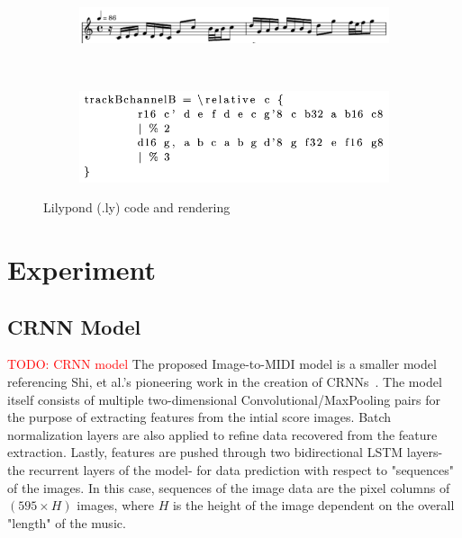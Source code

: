 \documentclass[review,sigconf]{acmart}
\newcommand{\todo}[1]{\textcolor{red}{TODO: #1}}
\begin{document}
\begin{figure}
	\begin{subfigure}
		\centering
		\includegraphics[width = .8\linewidth]{./figures/lilypond-snippet.png}
	\end{subfigure}
	~
	\begin{subfigure}
		\centering
		\includegraphics[width = .8\linewidth]{./figures/lilypond-code.png}
	\end{subfigure}
	\caption{Lilypond (.ly) code and rendering}
	\label{fig:lilypond-example}
\end{figure}

\section{Experiment}

\subsection{CRNN Model}
\todo{CRNN model}
The proposed Image-to-MIDI model is a smaller model referencing Shi, et al.'s pioneering work in the creation of CRNNs~\cite{shi2015endtoend}.
The model itself consists of multiple two-dimensional Convolutional/MaxPooling pairs for the purpose of extracting features from the intial score images.
Batch normalization layers are also applied to refine data recovered from the feature extraction.
Lastly, features are pushed through two bidirectional LSTM layers- the recurrent layers of the model- for data prediction with respect to "sequences" of the images.
In this case, sequences of the image data are the pixel columns of $(595 \times H)$ images, where $H$ is the height of the image dependent on the overall "length" of the music.
\end{document}
